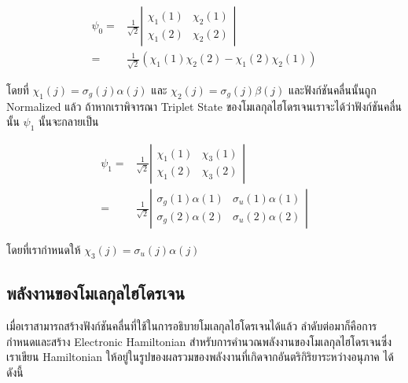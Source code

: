 \begin{equation}
  \begin{aligned}
    \psi_0
    = &
    \frac{1}{\sqrt{2}}
    \left|
    \begin{array}{ll}
      \chi_1(1) & \chi_2(1) \\
      \chi_1(2) & \chi_2(2)
    \end{array}
    \right| \\
    = &
    \frac{1}{\sqrt{2}}
    \left(
    \chi_1(1) \chi_2(2) - \chi_1(2) \chi_2(1)
    \right)
  \end{aligned}
\end{equation}

\noindent โดยที่ $\chi_1(j) = \sigma_g(j) \alpha(j)$ และ $\chi_2(j) = \sigma_g(j) \beta(j)$ และฟังก์ชันคลื่นนั้นถูก
Normalized แล้ว ถ้าหากเราพิจารณา Triplet State ของโมเลกุลไฮโดรเจนเราจะได้ว่าฟังก์ชันคลื่นนั้น $\psi_1$ นั้นจะกลายเป็น

\begin{equation}
  \begin{aligned}
    \psi_1
    = &
    \frac{1}{\sqrt{2}}
    \left|
    \begin{array}{ll}
      \chi_1(1) & \chi_3(1) \\
      \chi_1(2) & \chi_3(2)
    \end{array}
    \right|                \\
    = & \frac{1}{\sqrt{2}}
    \left|
    \begin{array}{ll}
      \sigma_g(1) \alpha(1) & \sigma_u(1) \alpha(1) \\
      \sigma_g(2) \alpha(2) & \sigma_u(2) \alpha(2)
    \end{array}
    \right|
  \end{aligned}
\end{equation}

\noindent โดยที่เรากำหนดให้ $\chi_3(j) = \sigma_u(j) \alpha(j)$

\subsection{พลังงานของโมเลกุลไฮโดรเจน}

เมื่อเราสามารถสร้างฟังก์ชันคลื่นที่ใช้ในการอธิบายโมเลกุลไฮโดรเจนได้แล้ว ลำดับต่อมาก็คือการกำหนดและสร้าง Electronic Hamiltonian
สำหรับการคำนวณพลังงานของโมเลกุลไฮโดรเจนซึ่งเราเขียน Hamiltonian ให้อยู่ในรูปของผลรวมของพลังงานที่เกิดจากอันตริกิริยาระหว่างอนุภาค%
ได้ดังนี้


